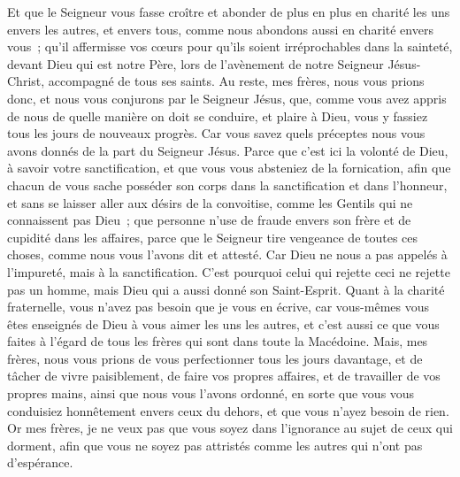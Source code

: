 \begin{multicols}{2}
Et que le Seigneur vous fasse croître et abonder de plus en plus en charité les uns envers les autres, et envers tous, comme nous abondons aussi en charité envers vous~;
qu'il affermisse vos cœurs pour qu'ils soient irréprochables dans la sainteté, devant Dieu qui est notre Père, lors de l'avènement de notre Seigneur Jésus-Christ, accompagné de tous ses saints.
\VerseOne{}Au reste, mes frères, nous vous prions donc, et nous vous conjurons par le Seigneur Jésus, que, comme vous avez appris de nous de quelle manière on doit se conduire, et plaire à Dieu, vous y fassiez tous les jours de nouveaux progrès.
Car vous savez quels préceptes nous vous avons donnés de la part du Seigneur Jésus.
Parce que c'est ici la volonté de Dieu, à savoir votre sanctification, et que vous vous absteniez de la fornication,
afin que chacun de vous sache posséder son corps dans la sanctification et dans l'honneur,
et sans se laisser aller aux désirs de la convoitise, comme les Gentils qui ne connaissent pas Dieu~;
que personne n'use de fraude envers son frère et de cupidité dans les affaires, parce que le Seigneur tire vengeance de toutes ces choses, comme nous vous l'avons dit et attesté.
Car Dieu ne nous a pas appelés à l'impureté, mais à la sanctification.
C'est pourquoi celui qui rejette ceci ne rejette pas un homme, mais Dieu qui a aussi donné son Saint-Esprit.
Quant à la charité fraternelle, vous n'avez pas besoin que je vous en écrive, car vous-mêmes vous êtes enseignés de Dieu à vous aimer les uns les autres,
et c'est aussi ce que vous faites à l'égard de tous les frères qui sont dans toute la Macédoine. Mais, mes frères, nous vous prions de vous perfectionner tous les jours davantage,
et de tâcher de vivre paisiblement, de faire vos propres affaires, et de travailler de vos propres mains, ainsi que nous vous l'avons ordonné,
en sorte que vous vous conduisiez honnêtement envers ceux du dehors, et que vous n'ayez besoin de rien.
Or mes frères, je ne veux pas que vous soyez dans l'ignorance au sujet de ceux qui dorment, afin que vous ne soyez pas attristés comme les autres qui n'ont pas d'espérance. 

\end{multicols}
